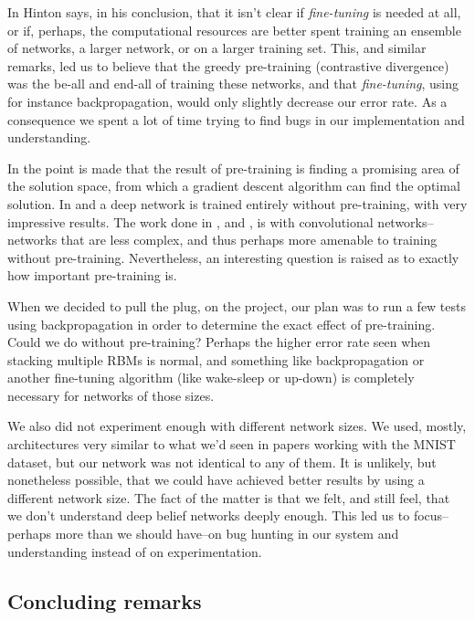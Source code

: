 \documentclass[11pt]{article}
\begin{document}
In \cite{hinton06} Hinton says, in his conclusion, that it isn't clear if \textit{fine-tuning} is needed at all, or if, perhaps, the computational resources are better spent training an ensemble of networks, a larger network, or on a larger training set.  This, and similar remarks, led us to believe that the greedy pre-training (contrastive divergence) was the be-all and end-all of training these networks, and that \textit{fine-tuning}, using for instance backpropagation, would only slightly decrease our error rate.  As a consequence we spent a lot of time trying to find bugs in our implementation and understanding.

In \cite{bengio07} the point is made that the result of pre-training is finding a promising area of the solution space, from which a gradient descent algorithm can find the optimal solution.  In \cite{ciresan} and \cite{ciresan2} a deep network is trained entirely without pre-training, with very impressive results.  The work done in \cite{ciresan}, and \cite{ciresan2}, is with convolutional networks--networks that are less complex, and thus perhaps more amenable to training without pre-training. Nevertheless, an interesting question is raised as to exactly how important pre-training is.

When we decided to pull the plug, on the project, our plan was to run a few tests using backpropagation in order to determine the exact effect of pre-training.  Could we do without pre-training?  Perhaps the higher error rate seen when stacking multiple RBMs is normal, and something like backpropagation or another fine-tuning algorithm (like wake-sleep or up-down) is completely necessary for networks of those sizes.

We also did not experiment enough with different network sizes.  We used, mostly, architectures very similar to what we'd seen in papers working with the MNIST dataset, but our network was not identical to any of them.  It is unlikely, but nonetheless possible, that we could have achieved better results by using a different network size.  The fact of the matter is that we felt, and still feel, that we don't understand deep belief networks deeply enough.  This led us to focus--perhaps more than we should have--on bug hunting in our system and understanding instead of on experimentation.

\subsection{Concluding remarks}
\end{document}
